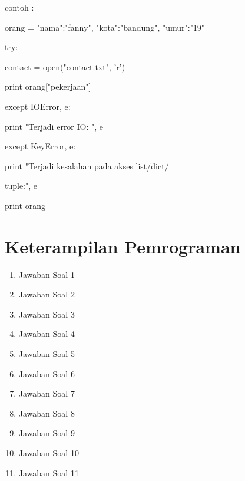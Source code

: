 contoh :

orang = {"nama":"fanny", "kota":"bandung", "umur":"19"}

try:

    contact = open("contact.txt", 'r')
    
    print orang["pekerjaan"]
    
except IOError, e:

    print "Terjadi error IO: ", e
    
except KeyError, e:

    print "Terjadi kesalahan pada akses list/dict/
    
    tuple:", e

print orang


\section{Keterampilan Pemrograman}
\begin{enumerate}

\item Jawaban Soal 1


\item Jawaban Soal 2


\item Jawaban Soal 3


\item Jawaban Soal 4


\item Jawaban Soal 5


\item Jawaban Soal 6


\item Jawaban Soal 7


\item Jawaban Soal 8


\item Jawaban Soal 9

\item Jawaban Soal 10


\item Jawaban Soal 11

\end{enumerate}

